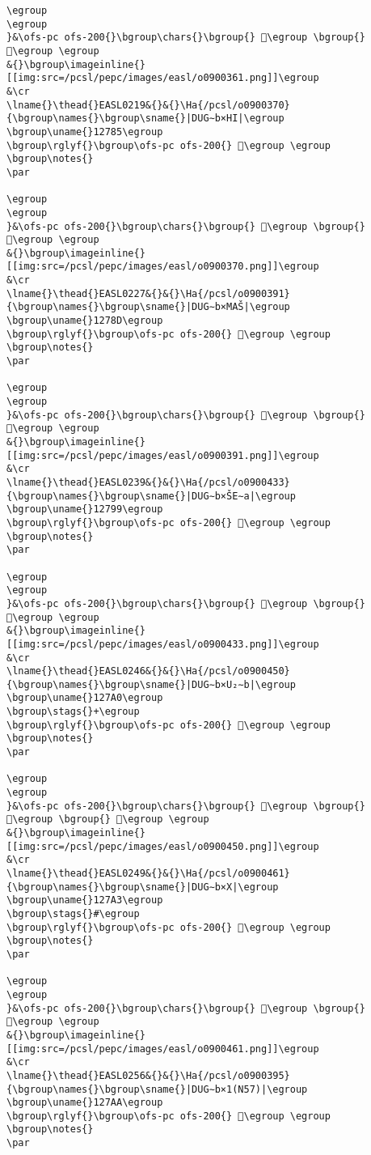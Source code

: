 \begin{verbatim}
\egroup
\egroup
}&\ofs-pc ofs-200{}\bgroup\chars{}\bgroup{} 𒞰\egroup \bgroup{} 𒞁\egroup \egroup
&{}\bgroup\imageinline{}[[img:src=/pcsl/pepc/images/easl/o0900361.png]]\egroup
&\cr
\lname{}\thead{}EASL0219&{}&{}\Ha{/pcsl/o0900370}{\bgroup\names{}\bgroup\sname{}|DUG∼b×HI|\egroup
\bgroup\uname{}12785\egroup
\bgroup\rglyf{}\bgroup\ofs-pc ofs-200{} 𒞅\egroup \egroup
\bgroup\notes{}
\par 

\egroup
\egroup
}&\ofs-pc ofs-200{}\bgroup\chars{}\bgroup{} 𒞱\egroup \bgroup{} 𒞅\egroup \egroup
&{}\bgroup\imageinline{}[[img:src=/pcsl/pepc/images/easl/o0900370.png]]\egroup
&\cr
\lname{}\thead{}EASL0227&{}&{}\Ha{/pcsl/o0900391}{\bgroup\names{}\bgroup\sname{}|DUG∼b×MAŠ|\egroup
\bgroup\uname{}1278D\egroup
\bgroup\rglyf{}\bgroup\ofs-pc ofs-200{} 𒞍\egroup \egroup
\bgroup\notes{}
\par 

\egroup
\egroup
}&\ofs-pc ofs-200{}\bgroup\chars{}\bgroup{} 𒞳\egroup \bgroup{} 𒞍\egroup \egroup
&{}\bgroup\imageinline{}[[img:src=/pcsl/pepc/images/easl/o0900391.png]]\egroup
&\cr
\lname{}\thead{}EASL0239&{}&{}\Ha{/pcsl/o0900433}{\bgroup\names{}\bgroup\sname{}|DUG∼b×ŠE∼a|\egroup
\bgroup\uname{}12799\egroup
\bgroup\rglyf{}\bgroup\ofs-pc ofs-200{} 𒞙\egroup \egroup
\bgroup\notes{}
\par 

\egroup
\egroup
}&\ofs-pc ofs-200{}\bgroup\chars{}\bgroup{} 𒞴\egroup \bgroup{} 𒞙\egroup \egroup
&{}\bgroup\imageinline{}[[img:src=/pcsl/pepc/images/easl/o0900433.png]]\egroup
&\cr
\lname{}\thead{}EASL0246&{}&{}\Ha{/pcsl/o0900450}{\bgroup\names{}\bgroup\sname{}|DUG∼b×U₂∼b|\egroup
\bgroup\uname{}127A0\egroup
\bgroup\stags{}+\egroup
\bgroup\rglyf{}\bgroup\ofs-pc ofs-200{} 𒞠\egroup \egroup
\bgroup\notes{}
\par 

\egroup
\egroup
}&\ofs-pc ofs-200{}\bgroup\chars{}\bgroup{} 𒞶\egroup \bgroup{} 𒞺\egroup \bgroup{} 𒞠\egroup \egroup
&{}\bgroup\imageinline{}[[img:src=/pcsl/pepc/images/easl/o0900450.png]]\egroup
&\cr
\lname{}\thead{}EASL0249&{}&{}\Ha{/pcsl/o0900461}{\bgroup\names{}\bgroup\sname{}|DUG∼b×X|\egroup
\bgroup\uname{}127A3\egroup
\bgroup\stags{}#\egroup
\bgroup\rglyf{}\bgroup\ofs-pc ofs-200{} 𒞣\egroup \egroup
\bgroup\notes{}
\par 

\egroup
\egroup
}&\ofs-pc ofs-200{}\bgroup\chars{}\bgroup{} 𒞷\egroup \bgroup{} 𒞣\egroup \egroup
&{}\bgroup\imageinline{}[[img:src=/pcsl/pepc/images/easl/o0900461.png]]\egroup
&\cr
\lname{}\thead{}EASL0256&{}&{}\Ha{/pcsl/o0900395}{\bgroup\names{}\bgroup\sname{}|DUG∼b×1(N57)|\egroup
\bgroup\uname{}127AA\egroup
\bgroup\rglyf{}\bgroup\ofs-pc ofs-200{} 𒞪\egroup \egroup
\bgroup\notes{}
\par 


\end{verbatim}
